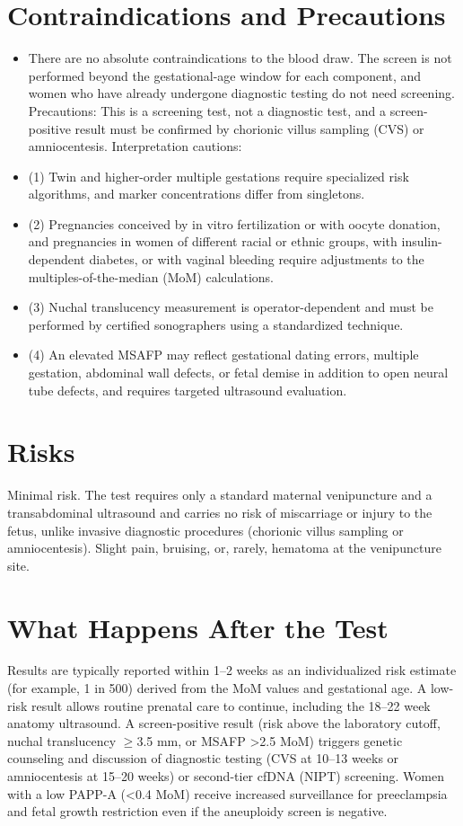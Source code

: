 \section*{Contraindications and Precautions}
\begin{itemize}
  \item There are no absolute contraindications to the blood draw. The screen is not performed beyond the gestational-age window for each component, and women who have already undergone diagnostic testing do not need screening. Precautions: This is a screening test, not a diagnostic test, and a screen-positive result must be confirmed by chorionic villus sampling (CVS) or amniocentesis. Interpretation cautions:
  \item (1) Twin and higher-order multiple gestations require specialized risk algorithms, and marker concentrations differ from singletons.
  \item (2) Pregnancies conceived by in vitro fertilization or with oocyte donation, and pregnancies in women of different racial or ethnic groups, with insulin-dependent diabetes, or with vaginal bleeding require adjustments to the multiples-of-the-median (MoM) calculations.
  \item (3) Nuchal translucency measurement is operator-dependent and must be performed by certified sonographers using a standardized technique.
  \item (4) An elevated MSAFP may reflect gestational dating errors, multiple gestation, abdominal wall defects, or fetal demise in addition to open neural tube defects, and requires targeted ultrasound evaluation.
\end{itemize}
\section*{Risks}
Minimal risk. The test requires only a standard maternal venipuncture and a transabdominal ultrasound and carries no risk of miscarriage or injury to the fetus, unlike invasive diagnostic procedures (chorionic villus sampling or amniocentesis). Slight pain, bruising, or, rarely, hematoma at the venipuncture site.

\section*{What Happens After the Test}
Results are typically reported within 1--2 weeks as an individualized risk estimate (for example, 1 in 500) derived from the MoM values and gestational age. A low-risk result allows routine prenatal care to continue, including the 18--22 week anatomy ultrasound. A screen-positive result (risk above the laboratory cutoff, nuchal translucency $\geq$3.5 mm, or MSAFP >2.5 MoM) triggers genetic counseling and discussion of diagnostic testing (CVS at 10--13 weeks or amniocentesis at 15--20 weeks) or second-tier cfDNA (NIPT) screening. Women with a low PAPP-A (<0.4 MoM) receive increased surveillance for preeclampsia and fetal growth restriction even if the aneuploidy screen is negative.

